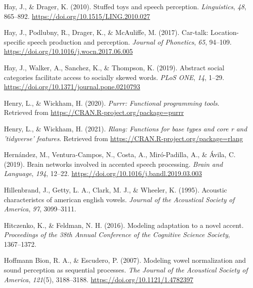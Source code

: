 \documentclass[
  11pt,
  man,floatsintext]{apa6}
\newlength{\cslhangindent}
\newlength{\cslentryspacingunit} %
\newenvironment{CSLReferences}[2] %
 {%
  \setlength{\parindent}{0pt}
  \ifodd #1
  \let\oldpar\par
  \def\par{\hangindent=\cslhangindent\oldpar}
  \fi
  \setlength{\parskip}{#2\cslentryspacingunit}
 }%
 {}
\begin{document}
\begin{CSLReferences}{1}{0}
\leavevmode{}%
Hay, J., \& Drager, K. (2010). Stuffed toys and speech perception. \emph{Linguistics}, \emph{48}, 865--892. \url{https://doi.org/10.1515/LING.2010.027}

\leavevmode{}%
Hay, J., Podlubny, R., Drager, K., \& McAuliffe, M. (2017). Car-talk: Location-specific speech production and perception. \emph{Journal of Phonetics}, \emph{65}, 94--109. \url{https://doi.org/10.1016/j.wocn.2017.06.005}

\leavevmode{}%
Hay, J., Walker, A., Sanchez, K., \& Thompson, K. (2019). Abstract social categories facilitate access to socially skewed words. \emph{PLoS ONE}, \emph{14}, 1--29. \url{https://doi.org/10.1371/journal.pone.0210793}

\leavevmode{}%
Henry, L., \& Wickham, H. (2020). \emph{Purrr: Functional programming tools}. Retrieved from \url{https://CRAN.R-project.org/package=purrr}

\leavevmode{}%
Henry, L., \& Wickham, H. (2021). \emph{Rlang: Functions for base types and core r and 'tidyverse' features}. Retrieved from \url{https://CRAN.R-project.org/package=rlang}

\leavevmode{}%
Hernández, M., Ventura-Campos, N., Costa, A., Miró-Padilla, A., \& Ávila, C. (2019). Brain networks involved in accented speech processing. \emph{Brain and Language}, \emph{194}, 12--22. \url{https://doi.org/10.1016/j.bandl.2019.03.003}

\leavevmode{}%
Hillenbrand, J., Getty, L. A., Clark, M. J., \& Wheeler, K. (1995). Acoustic characteristcs of american english vowels. \emph{Journal of the Acoustical Society of America}, \emph{97}, 3099--3111.

\leavevmode{}%
Hitczenko, K., \& Feldman, N. H. (2016). Modeling adaptation to a novel accent. \emph{Proceedings of the 38th Annual Conference of the Cognitive Science Society}, 1367--1372.

\leavevmode{}%
Hoffmann Bion, R. A., \& Escudero, P. (2007). Modeling vowel normalization and sound perception as sequential processes. \emph{The Journal of the Acoustical Society of America}, \emph{121}(5), 3188--3188. \url{https://doi.org/10.1121/1.4782397}


\end{CSLReferences}
\end{document}

